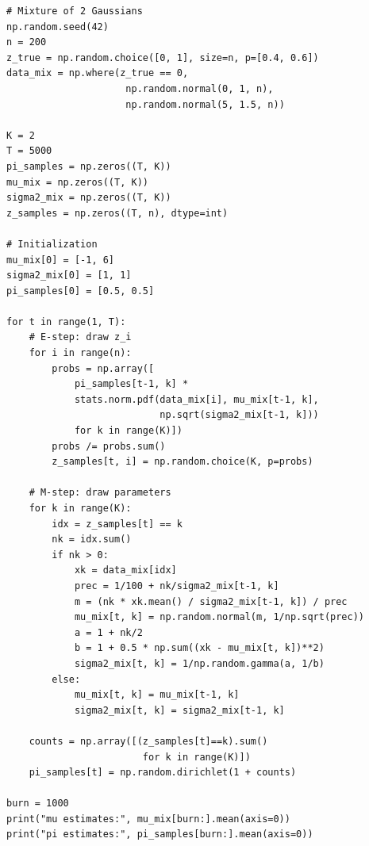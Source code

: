 \begin{codeblock}[title=\textbf{Gibbs for Gaussian mixture}]
\begin{verbatim}
# Mixture of 2 Gaussians
np.random.seed(42)
n = 200
z_true = np.random.choice([0, 1], size=n, p=[0.4, 0.6])
data_mix = np.where(z_true == 0,
                     np.random.normal(0, 1, n),
                     np.random.normal(5, 1.5, n))

K = 2
T = 5000
pi_samples = np.zeros((T, K))
mu_mix = np.zeros((T, K))
sigma2_mix = np.zeros((T, K))
z_samples = np.zeros((T, n), dtype=int)

# Initialization
mu_mix[0] = [-1, 6]
sigma2_mix[0] = [1, 1]
pi_samples[0] = [0.5, 0.5]

for t in range(1, T):
    # E-step: draw z_i
    for i in range(n):
        probs = np.array([
            pi_samples[t-1, k] *
            stats.norm.pdf(data_mix[i], mu_mix[t-1, k],
                           np.sqrt(sigma2_mix[t-1, k]))
            for k in range(K)])
        probs /= probs.sum()
        z_samples[t, i] = np.random.choice(K, p=probs)

    # M-step: draw parameters
    for k in range(K):
        idx = z_samples[t] == k
        nk = idx.sum()
        if nk > 0:
            xk = data_mix[idx]
            prec = 1/100 + nk/sigma2_mix[t-1, k]
            m = (nk * xk.mean() / sigma2_mix[t-1, k]) / prec
            mu_mix[t, k] = np.random.normal(m, 1/np.sqrt(prec))
            a = 1 + nk/2
            b = 1 + 0.5 * np.sum((xk - mu_mix[t, k])**2)
            sigma2_mix[t, k] = 1/np.random.gamma(a, 1/b)
        else:
            mu_mix[t, k] = mu_mix[t-1, k]
            sigma2_mix[t, k] = sigma2_mix[t-1, k]

    counts = np.array([(z_samples[t]==k).sum()
                        for k in range(K)])
    pi_samples[t] = np.random.dirichlet(1 + counts)

burn = 1000
print("mu estimates:", mu_mix[burn:].mean(axis=0))
print("pi estimates:", pi_samples[burn:].mean(axis=0))
\end{verbatim}
\end{codeblock}

